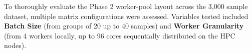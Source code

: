 To thoroughly evaluate the Phase 2 worker-pool layout across the 3,000 sample dataset, multiple matrix configurations were assessed. Variables tested included \textbf{Batch Size} (from groups of 20 up to 40 samples) and \textbf{Worker Granularity} (from 4 workers locally, up to 96 cores sequentially distributed on the HPC nodes).
